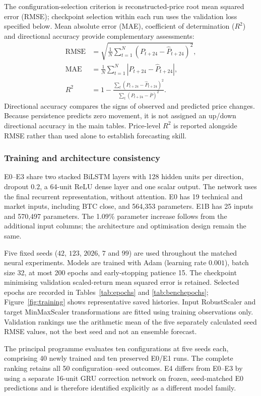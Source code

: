 The configuration-selection criterion is reconstructed-price root mean squared error (RMSE); checkpoint selection within each run uses the validation loss specified below. Mean absolute error (MAE), coefficient of determination ($R^2$) and directional accuracy provide complementary assessments:
\begin{align}
\mathrm{RMSE}&=\sqrt{\frac{1}{N}\sum_{t=1}^{N}(P_{t+24}-\widehat P_{t+24})^2}, \\
\mathrm{MAE}&=\frac{1}{N}\sum_{t=1}^{N}|P_{t+24}-\widehat P_{t+24}|,\\
R^2&=1-\frac{\sum_t(P_{t+24}-\widehat P_{t+24})^2}
{\sum_t(P_{t+24}-\overline P)^2}.
\label{eq:exp_metrics}
\end{align}
Directional accuracy compares the signs of observed and predicted price changes. Because persistence predicts zero movement, it is not assigned an up/down directional accuracy in the main tables. Price-level $R^2$ is reported alongside RMSE rather than used alone to establish forecasting skill.

\subsubsection{Training and architecture consistency}

E0--E3 share two stacked BiLSTM layers with 128 hidden units per direction, dropout $0.2$, a 64-unit ReLU dense layer and one scalar output. The network uses the final recurrent representation, without attention. E0 has 19 technical and market inputs, including BTC close, and 564,353 parameters. E1B has 25 inputs and 570,497 parameters. The 1.09\% parameter increase follows from the additional input columns; the architecture and optimisation design remain the same.

Five fixed seeds ($42$, $123$, $2026$, $7$ and $99$) are used throughout the matched neural experiments. Models are trained with Adam (learning rate $0.001$), batch size 32, at most 200 epochs and early-stopping patience 15. The checkpoint minimising validation scaled-return mean squared error is retained. Selected epochs are recorded in Tables~\ref{tab:epochs} and \ref{tab:benchepochs}; Figure~\ref{fig:training} shows representative saved histories. Input RobustScaler and target MinMaxScaler transformations are fitted using training observations only. Validation rankings use the arithmetic mean of the five separately calculated seed RMSE values, not the best seed and not an ensemble forecast.

The principal programme evaluates ten configurations at five seeds each, comprising 40 newly trained and ten preserved E0/E1 runs. The complete ranking retains all 50 configuration--seed outcomes. E4 differs from E0--E3 by using a separate 16-unit GRU correction network on frozen, seed-matched E0 predictions and is therefore identified explicitly as a different model family.

